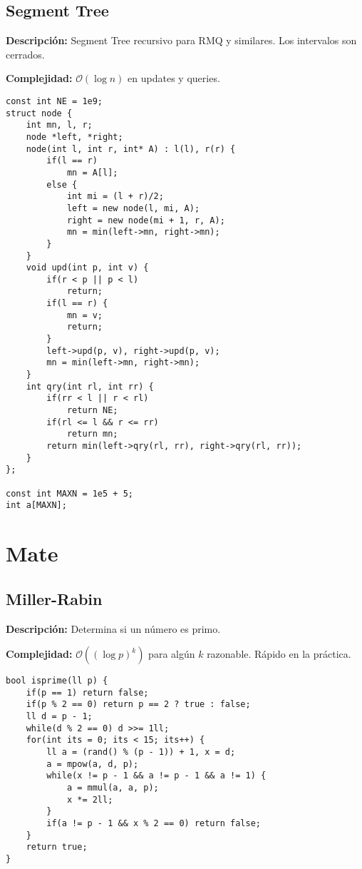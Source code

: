 \documentclass[twocolumn]{article}
\begin{document}
\subsection{Segment Tree}
\begin{footnotesize}{\bf Descripción:} Segment Tree recursivo para RMQ y similares. Los intervalos son cerrados.


{\bf Complejidad:} $\mathcal{O}(\log n)$ en updates y queries.
\end{footnotesize}\lstset{basicstyle=\footnotesize\ttfamily,breaklines=true,tabsize=2,language=C++,frame=leftline, numbers=left, numberstyle=\tiny, numbersep=5pt}
\begin{lstlisting}
const int NE = 1e9;
struct node {
	int mn, l, r;
	node *left, *right;
	node(int l, int r, int* A) : l(l), r(r) {
		if(l == r)
			mn = A[l];
		else {
			int mi = (l + r)/2;
			left = new node(l, mi, A);
			right = new node(mi + 1, r, A);
			mn = min(left->mn, right->mn);
		}
	}
	void upd(int p, int v) {
		if(r < p || p < l)
			return;
		if(l == r) {
			mn = v;
			return;
		}
		left->upd(p, v), right->upd(p, v);
		mn = min(left->mn, right->mn);
	}
	int qry(int rl, int rr) {
		if(rr < l || r < rl)
			return NE;
		if(rl <= l && r <= rr)
			return mn;
		return min(left->qry(rl, rr), right->qry(rl, rr));
	}
};

const int MAXN = 1e5 + 5;
int a[MAXN];

\end{lstlisting}
\section{Mate}
\subsection{Miller-Rabin}
\begin{footnotesize}{\bf Descripción: } Determina si un número es primo.


{\bf Complejidad: } $\mathcal{O}((\log p)^k)$ para algún $k$ razonable. Rápido en la práctica.
\end{footnotesize}\lstset{basicstyle=\footnotesize\ttfamily,breaklines=true,tabsize=2,language=C++,frame=leftline, numbers=left, numberstyle=\tiny, numbersep=5pt}
\begin{lstlisting}
bool isprime(ll p) {
	if(p == 1) return false;
	if(p % 2 == 0) return p == 2 ? true : false;
	ll d = p - 1;
	while(d % 2 == 0) d >>= 1ll;
	for(int its = 0; its < 15; its++) {
		ll a = (rand() % (p - 1)) + 1, x = d;
		a = mpow(a, d, p);
		while(x != p - 1 && a != p - 1 && a != 1) {
			a = mmul(a, a, p);
			x *= 2ll;
		}
		if(a != p - 1 && x % 2 == 0) return false;
	}
	return true;
}
\end{lstlisting}
\end{document}
